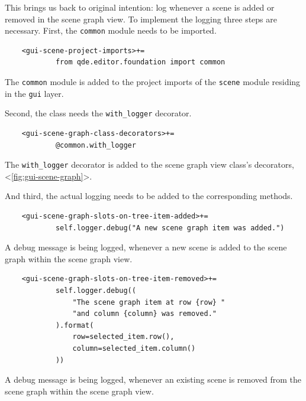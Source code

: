 \documentclass[10pt, openright, notitlepage]{scrreprt}
\begin{document}
This brings us back to original intention: log whenever a scene is added or
removed in the scene graph view. To implement the logging three steps are
necessary. First, the \texttt{common} module needs to be imported.

\begin{listing}[H]
\begin{verbatim}
    <gui-scene-project-imports>+=
            from qde.editor.foundation import common
\end{verbatim}
\caption{\label{lst:gui-scene-project-imports-02}
The \texttt{common} module is added to the project imports of the \texttt{scene} module residing in the \texttt{gui} layer.}
\end{listing}

Second, the class needs the \texttt{with\_logger} decorator.

\begin{listing}[H]
\begin{verbatim}
    <gui-scene-graph-class-decorators>+=
            @common.with_logger
\end{verbatim}
\caption{\label{lst:gui-scene-graph-class-decorators-01}
The \texttt{with\_logger} decorator is added to the scene graph view class's decorators, <\ref{fig:gui-scene-graph}>.}
\end{listing}

And third, the actual logging needs to be added to the corresponding methods.

\begin{listing}[H]
\begin{verbatim}
    <gui-scene-graph-slots-on-tree-item-added>+=
            self.logger.debug("A new scene graph item was added.")
\end{verbatim}
\caption{\label{lst:gui-scene-graph-slots-on-tree-item-added-logging}
A debug message is being logged, whenever a new scene is added to the scene graph within the scene graph view.}
\end{listing}

\begin{listing}[H]
\begin{verbatim}
    <gui-scene-graph-slots-on-tree-item-removed>+=
            self.logger.debug((
                "The scene graph item at row {row} "
                "and column {column} was removed."
            ).format(
                row=selected_item.row(),
                column=selected_item.column()
            ))
\end{verbatim}
\caption{\label{lst:gui-scene-graph-slots-on-tree-item-removed-logging}
A debug message is being logged, whenever an existing scene is removed from the scene graph within the scene graph view.}
\end{listing}
\end{document}
